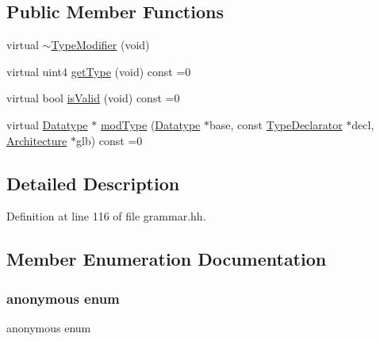 \subsection*{Public Member Functions}
\begin{DoxyCompactItemize}
\item 
virtual \mbox{\hyperlink{class_type_modifier_abf04bdcbbffd7d344fcd2ea3fb2e43a0}{$\sim$\+Type\+Modifier}} (void)
\item 
virtual uint4 \mbox{\hyperlink{class_type_modifier_aac3cedefacdceace7669f57b9bd42df6}{get\+Type}} (void) const =0
\item 
virtual bool \mbox{\hyperlink{class_type_modifier_a67477f048c4ede6b0a0419bf399f2113}{is\+Valid}} (void) const =0
\item 
virtual \mbox{\hyperlink{class_datatype}{Datatype}} $\ast$ \mbox{\hyperlink{class_type_modifier_aa476545f31ae45f4bd39c8afb7403406}{mod\+Type}} (\mbox{\hyperlink{class_datatype}{Datatype}} $\ast$base, const \mbox{\hyperlink{class_type_declarator}{Type\+Declarator}} $\ast$decl, \mbox{\hyperlink{class_architecture}{Architecture}} $\ast$glb) const =0
\end{DoxyCompactItemize}


\subsection{Detailed Description}


Definition at line 116 of file grammar.\+hh.



\subsection{Member Enumeration Documentation}
\mbox{\label{class_type_modifier_a5b036907331ce7a7b71fa40cfc277b78}} 
\subsubsection{\texorpdfstring{anonymous enum}{anonymous enum}}
{\footnotesize\ttfamily anonymous enum}

